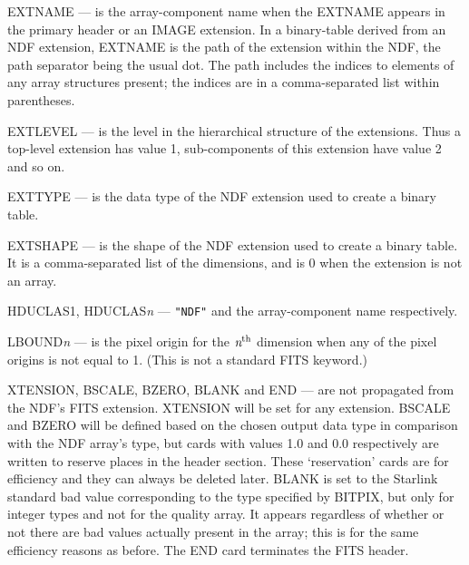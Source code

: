 \documentclass[twoside,11pt]{article}
\newcommand{\xref}[3]{#1}
\newcommand{\sstitem}{\item}
\newcommand{\sstitem}{\item}
\begin{document}
{{{{            \sstitem
            EXTNAME --- is the array-component name when the EXTNAME
              appears in the primary header or an IMAGE extension.  In a
              binary-table derived from an NDF extension, EXTNAME is the
              path of the extension within the NDF, the path separator
              being the usual dot.  The path includes the indices to
              elements of any array structures present; the indices are in
              a comma-separated list within parentheses.

            \sstitem
            EXTLEVEL --- is the level in the hierarchical structure of the
              extensions.  Thus a top-level extension has value 1,
              sub-components of this extension have value 2 and so on.

            \sstitem
            EXTTYPE --- is the data type of the NDF extension used to
              create a binary table.

            \sstitem
            EXTSHAPE --- is the shape of the NDF extension used to
            create a binary table.  It is a comma-separated list of the
            dimensions, and is 0 when the extension is not an array.

            \sstitem
            HDUCLAS1, HDUCLAS{\em{n}} --- \texttt{"NDF"} and the
              array-component name respectively.

            \sstitem
            LBOUND{\textit{n}} --- is the pixel origin for the 
              $\textit{n}^{\rm th}$ dimension
              when any of the pixel origins is not equal to 1.  (This is not a
              standard FITS keyword.)

            \sstitem
            XTENSION, BSCALE, BZERO, BLANK and END --- are not propagated
              from the NDF's FITS extension.  XTENSION will be set for
              any extension.  BSCALE and BZERO will be defined based on
              the chosen output data type in comparison with the NDF
              array's type, but cards with values 1.0 and 0.0 respectively
              are written to reserve places in the header section.  These
              `reservation' cards are for efficiency and they can always
              be deleted later.  BLANK is set to the Starlink standard 
              \xref{bad value}{sun95}{se_badmasking} corresponding to the type
              specified by BITPIX, but only for integer types and not for the
              quality array.  It appears regardless of whether or not there are
              bad values actually present in the array; this is for the same
              efficiency reasons as before.  The END card terminates the FITS header.

}}}}
\end{document}
